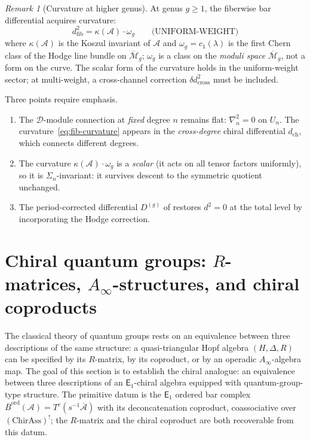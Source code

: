 \documentclass[11pt,reqno]{amsart}
\theoremstyle{definition}
\theoremstyle{remark}
\newtheorem{remark}[theorem]{Remark}
\newcommand{\cA}{\mathcal{A}}
\newcommand{\cD}{\mathcal{D}}
\newcommand{\cM}{\mathcal{M}}
\newcommand{\Ainf}{A_{\infty}}
\newcommand{\Eone}{\mathsf{E}_{1}}
\newcommand{\Barord}{\overline{B}^{\mathrm{ord}}}
\numberwithin{equation}{section}
\begin{document}
\begin{remark}[Curvature at higher genus]
\label{rem:higher-genus-curvature}
At genus $g \geq 1$, the fiberwise bar differential acquires
curvature:
\begin{equation}\label{eq:fib-curvature}
  d_{\mathrm{fib}}^2 = \kappa(\cA) \cdot \omega_g
  \qquad\text{(UNIFORM-WEIGHT)}
\end{equation}
where $\kappa(\cA)$ is the Koszul invariant of $\cA$ and
$\omega_g = c_1(\lambda)$ is the first Chern class of the
Hodge line bundle on $\overline{\cM}_g$; $\omega_g$ is a
class on the \emph{moduli space} $\overline{\cM}_g$, not
a form on the curve. The scalar form of the curvature
holds in the uniform-weight sector; at multi-weight,
a cross-channel correction $\delta d^2_{\mathrm{cross}}$
must be included.

Three points require emphasis.
\begin{enumerate}[label=\textup{(\alph*)}]
\item The $\cD$-module connection at \emph{fixed} degree $n$
  remains flat: $\nabla_n^2 = 0$ on $U_n$.
  The curvature~\eqref{eq:fib-curvature} appears in the
  \emph{cross-degree} chiral differential $d_{\mathrm{ch}}$,
  which connects different degrees.
\item The curvature $\kappa(\cA) \cdot \omega_g$ is a
  \emph{scalar} (it acts on all tensor factors uniformly),
  so it is $\Sigma_n$-invariant: it survives descent to
  the symmetric quotient unchanged.
\item The period-corrected differential $D^{(g)}$ of
  \cite[\S II.3]{Lorgat26I} restores $d^2 = 0$ at the
  total level by incorporating the Hodge correction.
\end{enumerate}
\end{remark}

\section{Chiral quantum groups: $R$-matrices, $\Ainf$-structures,
and chiral coproducts}
\label{sec:chiral-quantum-groups}

The classical theory of quantum groups rests on an equivalence
between three descriptions of the same structure: a
quasi-triangular Hopf algebra $(H, \Delta, R)$ can be
specified by its $R$-matrix, by its coproduct, or by an
operadic $\Ainf$-algebra map. The goal of this section is to
establish the chiral analogue: an equivalence between three
descriptions of an $\Eone$-chiral algebra equipped with
quantum-group-type structure. The primitive datum is the
$\Eone$ ordered bar complex
$\Barord(\cA) = T^c(s^{-1}\bar{\cA})$ with its
deconcatenation coproduct, coassociative over
$(\mathrm{ChirAss})^!$; the $R$-matrix and the chiral
coproduct are both recoverable from this datum.
\end{document}
